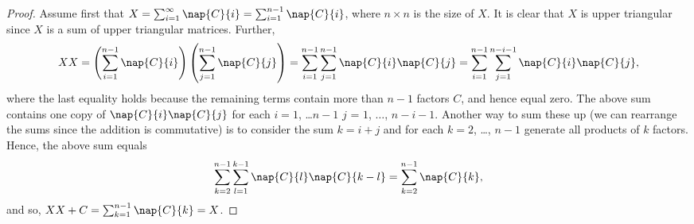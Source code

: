  \begin{proof}
   Assume first that $X = \sum_{i = 1}^\infty \nap{C}{i}= \sum_{i = 1}^{n-1}\nap{C}{i}$, where $n \times n$ is the size of $X$. It is clear that $X$ is upper triangular since $X$ is a sum of upper triangular matrices. Further, 
   \begin{equation*}
     X X = 
     \left(\sum_{i = 1}^{n-1}\nap{C}{i}\right)\left(\sum_{j = 1}^{n-1}\nap{C}{j}\right) =
     \sum_{i = 1}^{n - 1}\sum_{j = 1}^{n-1}\nap{C}{i}\nap{C}{j} = 
     \sum_{i = 1}^{n - 1}\sum_{j = 1}^{n - i - 1}\nap{C}{i}\nap{C}{j},
   \end{equation*}
   where the last equality holds because the remaining terms contain more than $n-1$ factors $C$, and hence equal zero.
   The above sum contains one copy of $\nap{C}{i}\nap{C}{j}$ for each $i = 1$, \ldots $n-1$ $j$ = $1$, $\ldots$, $n - i -1$. 
   Another way to sum these up (we can rearrange the sums since the addition is commutative) is to consider the sum $k = i + j$ and for each $k = 2$, \ldots, $n-1$ generate all products of $k$ factors. Hence, the above sum equals
   \begin{equation*}
     \sum_{k = 2}^{n-1}\sum_{l = 1}^{k-1}\nap{C}{l}\nap{C}{k-l} = \sum_{k = 2}^{n-1}\nap{C}{k},
   \end{equation*}
   and so, $XX + C = \sum_{k = 1}^{n-1}\nap{C}{k} = X$.


\end{proof}
